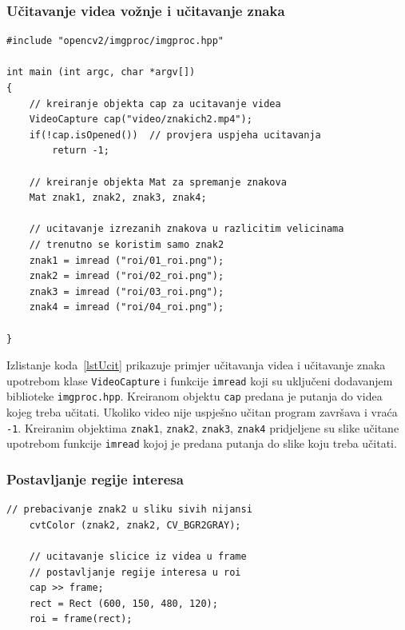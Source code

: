 \newpage
\subsubsection{Učitavanje videa vožnje i učitavanje znaka} %
\label{ssub:Učitavanje videa vožnje i učitavanje znaka}


\begin{lstlisting}[label=lstUcit,caption={Izvorni kod za učitavanje
videa i znaka}]
#include "opencv2/imgproc/imgproc.hpp"

int main (int argc, char *argv[])
{
    // kreiranje objekta cap za ucitavanje videa
    VideoCapture cap("video/znakich2.mp4");
    if(!cap.isOpened())  // provjera uspjeha ucitavanja
        return -1;

    // kreiranje objekta Mat za spremanje znakova
    Mat znak1, znak2, znak3, znak4;

    // ucitavanje izrezanih znakova u razlicitim velicinama
    // trenutno se koristim samo znak2 
    znak1 = imread ("roi/01_roi.png");      
    znak2 = imread ("roi/02_roi.png");
    znak3 = imread ("roi/03_roi.png");
    znak4 = imread ("roi/04_roi.png");

}
\end{lstlisting}

Izlistanje koda~\ref{lstUcit} prikazuje primjer učitavanja videa i
učitavanje znaka upotrebom klase \texttt{VideoCapture} i funkcije
\texttt{imread} koji su uključeni dodavanjem biblioteke
\texttt{imgproc.hpp}. Kreiranom objektu \texttt{cap} predana je putanja
do videa kojeg treba učitati. Ukoliko video nije uspješno učitan program
završava i vraća \texttt{-1}. Kreiranim objektima \texttt{znak1},
\texttt{znak2}, \texttt{znak3}, \texttt{znak4} pridjeljene su slike
učitane upotrebom funkcije \texttt{imread} kojoj je predana putanja do
slike koju treba učitati.


\newpage
\subsubsection{Postavljanje regije interesa} %
\label{ssub:Postavljanje regije interesa}


\begin{lstlisting}[label=lstRoi,caption={Izvorni kod za postvljanje
regije interesa}]
    // prebacivanje znak2 u sliku sivih nijansi
    cvtColor (znak2, znak2, CV_BGR2GRAY);
    
    // ucitavanje slicice iz videa u frame
    // postavljanje regije interesa u roi
    cap >> frame;
    rect = Rect (600, 150, 480, 120);
    roi = frame(rect);
    
\end{lstlisting}

